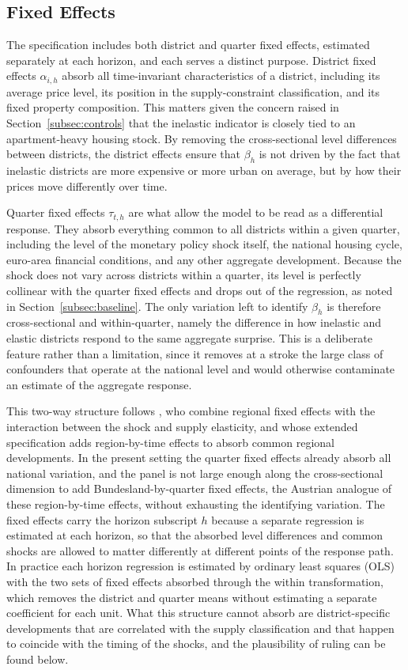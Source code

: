 \documentclass[a4paper,12pt, headsepline]{scrartcl}
\numberwithin{equation}{section}
\begin{document}
\subsection{Fixed Effects}\label{subsec:fe}
The specification includes both district and quarter fixed effects, estimated separately at each horizon, and each serves a distinct purpose. District fixed effects $\alpha_{i,h}$ absorb all time-invariant characteristics of a district, including its average price level, its position in the supply-constraint classification, and its fixed property composition. This matters given the concern raised in Section~\ref{subsec:controls} that the inelastic indicator is closely tied to an apartment-heavy housing stock. By removing the cross-sectional level differences between districts, the district effects ensure that $\beta_h$ is not driven by the fact that inelastic districts are more expensive or more urban on average, but by how their prices move differently over time.

Quarter fixed effects $\tau_{t,h}$ are what allow the model to be read as a differential response. They absorb everything common to all districts within a given quarter, including the level of the monetary policy shock itself, the national housing cycle, euro-area financial conditions, and any other aggregate development. Because the shock does not vary across districts within a quarter, its level is perfectly collinear with the quarter fixed effects and drops out of the regression, as noted in Section~\ref{subsec:baseline}. The only variation left to identify $\beta_h$ is therefore cross-sectional and within-quarter, namely the difference in how inelastic and elastic districts respond to the same aggregate surprise. This is a deliberate feature rather than a limitation, since it removes at a stroke the large class of confounders that operate at the national level and would otherwise contaminate an estimate of the aggregate response.

This two-way structure follows \citet{aastveit2022}, who combine regional fixed effects with the interaction between the shock and supply elasticity, and whose extended specification adds region-by-time effects to absorb common regional developments. In the present setting the quarter fixed effects already absorb all national variation, and the panel is not large enough along the cross-sectional dimension to add Bundesland-by-quarter fixed effects, the Austrian analogue of these region-by-time effects, without exhausting the identifying variation. The fixed effects carry the horizon subscript $h$ because a separate regression is estimated at each horizon, so that the absorbed level differences and common shocks are allowed to matter differently at different points of the response path. In practice each horizon regression is estimated by ordinary least squares (OLS) with the two sets of fixed effects absorbed through the within transformation, which removes the district and quarter means without estimating a separate coefficient for each unit. What this structure cannot absorb are district-specific developments that are correlated with the supply classification and that happen to coincide with the timing of the shocks, and the plausibility of ruling can be found below.
\end{document}
